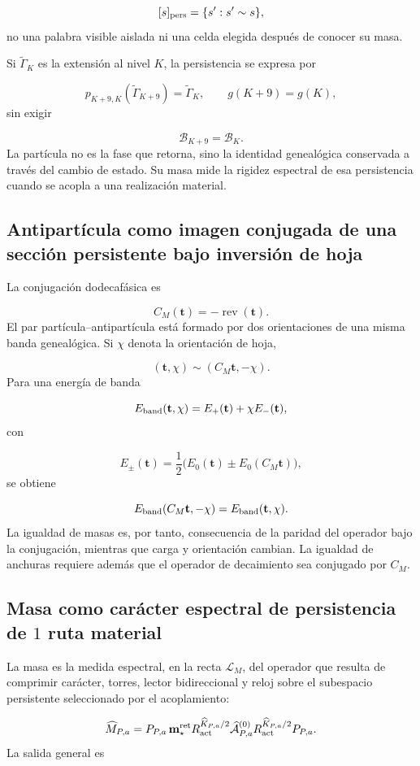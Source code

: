 \[
 [s]_{\rm pers}
 =\{s':s'\sim s\},
\]
no una palabra visible aislada ni una celda elegida después de conocer su masa.

Si \(\widetilde\Gamma_K\) es la extensión al nivel \(K\), la persistencia se expresa por

\[
 p_{K+9,K}(\widetilde\Gamma_{K+9})
 =\widetilde\Gamma_K,\qquad
 g(K+9)=g(K),
\]
sin exigir

\[
 \mathcal B_{K+9}=\mathcal B_K.
\]
La partícula no es la fase que retorna, sino la identidad genealógica conservada a través del cambio de estado. Su masa mide la rigidez espectral de esa persistencia cuando se acopla a una realización material.

\subsection{Antipartícula como imagen conjugada de una sección persistente bajo inversión de hoja}
La conjugación dodecafásica es

\[
 C_M(\mathbf t)=-\operatorname{rev}(\mathbf t).
\]
El par partícula--antipartícula está formado por dos orientaciones de una misma banda genealógica. Si \(\chi\) denota la orientación de hoja,

\[
 (\mathbf t,\chi)\sim(C_M\mathbf t,-\chi).
\]
Para una energía de banda

\[
 E_{\rm band}(\mathbf t,\chi)
 =E_+(\mathbf t)+\chi E_-(\mathbf t),
\]
con

\[
 E_\pm(\mathbf t)
 =\frac12\bigl(E_0(\mathbf t)\pm E_0(C_M\mathbf t)\bigr),
\]
se obtiene

\[
 E_{\rm band}(C_M\mathbf t,-\chi)
 =E_{\rm band}(\mathbf t,\chi).
\]
La igualdad de masas es, por tanto, consecuencia de la paridad del operador bajo la conjugación, mientras que carga y orientación cambian. La igualdad de anchuras requiere además que el operador de decaimiento sea conjugado por \(C_M\).

\subsection{Masa como carácter espectral de persistencia de \(1\) ruta material}
La masa es la medida espectral, en la recta \(\mathcal L_M\), del operador que resulta de comprimir carácter, torres, lector bidireccional y reloj sobre el subespacio persistente seleccionado por el acoplamiento:

\[
 \widehat M_{P,a}
 =P_{P,a}\,
 \mathbf m_\star^{\rm ret}
 R_{\rm act}^{\widehat K_{P,a}/2}
 \widehat{\mathcal A}_{P,a}^{(0)}
 R_{\rm act}^{\widehat K_{P,a}/2}
 P_{P,a}.
\]
La salida general es

